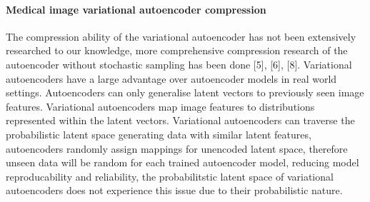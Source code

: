 \documentclass[review]{elsarticle}
\begin{document}


\paragraph{Medical image variational autoencoder compression} The compression ability of the variational autoencoder has not been extensively researched to our knowledge, more comprehensive compression research of the autoencoder without stochastic sampling has been done [5], [6], [8]. Variational autoencoders have a large advantage over autoencoder models in real world settings. Autoencoders can only generalise latent vectors to previously seen image features. Variational autoencoders map image features to distributions represented within the latent vectors. Variational autoencoders can traverse the probabilistic latent space generating data with similar latent features, autoencoders randomly assign mappings for unencoded latent space, therefore unseen data will be random for each trained autoencoder model, reducing model reproducability and reliability, the probabilitstic latent space of variational autoencoders does not experience this issue due to their probabilistic nature.
\end{document}
